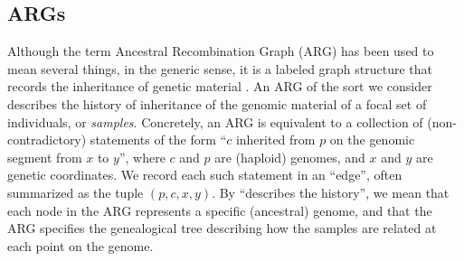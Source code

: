 \documentclass{article}
\begin{document}


\subsection*{ARGs} \label{par:recording}
Although the term Ancestral Recombination Graph (ARG) has been used to mean several things,
in the generic sense, it is a labeled graph structure that records
the inheritance of genetic material \citep{wong_general_2023}.
An ARG of the sort we consider describes the history of inheritance
of the genomic material of a focal set of individuals, or \emph{samples}.
Concretely, an ARG is equivalent to a collection of (non-contradictory) statements
of the form ``$c$ inherited from $p$ on the genomic segment from $x$ to $y$'',
where $c$ and $p$ are (haploid) genomes, and $x$ and $y$ are genetic coordinates.
We record each such statement in an ``edge'',
often summarized as the tuple $(p,c,x,y)$.
By ``describes the history'',
we mean that each node in the ARG represents a specific (ancestral) genome,
and that the ARG specifies the genealogical tree describing how the samples are related
at each point on the genome.
\end{document}
